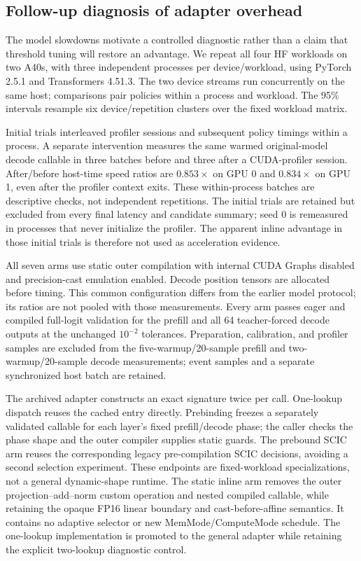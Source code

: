 \subsection{Follow-up diagnosis of adapter overhead}

\label{sec:adapter-ablation}

The model slowdowns motivate a controlled diagnostic rather than a claim that threshold tuning will restore an advantage. We repeat all four HF workloads on two A40s, with three independent processes per device/workload, using PyTorch 2.5.1 and Transformers 4.51.3. The two device streams run concurrently on the same host; comparisons pair policies within a process and workload. The 95\% intervals resample six device/repetition clusters over the fixed workload matrix.

Initial trials interleaved profiler sessions and subsequent policy timings within a process. A separate intervention measures the same warmed original-model decode callable in three batches before and three after a CUDA-profiler session. After/before host-time speed ratios are $0.853\times$ on GPU 0 and $0.834\times$ on GPU 1, even after the profiler context exits. These within-process batches are descriptive checks, not independent repetitions. The initial trials are retained but excluded from every final latency and candidate summary; seed 0 is remeasured in processes that never initialize the profiler. The apparent inline advantage in those initial trials is therefore not used as acceleration evidence.

All seven arms use static outer compilation with internal CUDA Graphs disabled and precision-cast emulation enabled. Decode position tensors are allocated before timing. This common configuration differs from the earlier model protocol; its ratios are not pooled with those measurements. Every arm passes eager and compiled full-logit validation for the prefill and all 64 teacher-forced decode outputs at the unchanged $10^{-2}$ tolerances. Preparation, calibration, and profiler samples are excluded from the five-warmup/20-sample prefill and two-warmup/20-sample decode measurements; event samples and a separate synchronized host batch are retained.

The archived adapter constructs an exact signature twice per call. One-lookup dispatch reuses the cached entry directly. Prebinding freezes a separately validated callable for each layer's fixed prefill/decode phase; the caller checks the phase shape and the outer compiler supplies static guards. The prebound SCIC arm reuses the corresponding legacy pre-compilation SCIC decisions, avoiding a second selection experiment. These endpoints are fixed-workload specializations, not a general dynamic-shape runtime. The static inline arm removes the outer projection--add--norm custom operation and nested compiled callable, while retaining the opaque FP16 linear boundary and cast-before-affine semantics. It contains no adaptive selector or new MemMode/ComputeMode schedule. The one-lookup implementation is promoted to the general adapter while retaining the explicit two-lookup diagnostic control.

